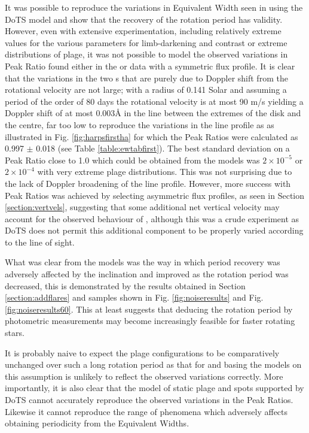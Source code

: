 It was possible to reproduce the variations in Equivalent Width seen in {\prox} using the DoTS model and show that the
recovery of the rotation period has validity. However, even with extensive experimentation, including relatively extreme
values for the various parameters for limb-darkening and contrast or extreme distributions of plage, it was not possible
to model the observed variations in Peak Ratio found either in the {\uves} or {\harps} data with a symmetric flux
profile. It is clear that the variations in the two \horn s that are purely due to Doppler shift from the rotational
velocity are not large; with a radius of 0.141 Solar \citep{demory09} and assuming a period of the order of 80 days the
rotational velocity is at most 90 m/s yielding a Doppler shift of at most 0.003{\AA} in the {\ha} line between the
extremes of the disk and the centre, far too low to reproduce the variations in the {\ha} line profile as as illustrated
in Fig. \ref{fig:harpsfirstha} for which the Peak Ratios were calculated as 0.997 $ \pm $ 0.018 (see Table
\ref{table:ewtabfirst}). The best standard deviation on a Peak Ratio close to 1.0 which could be obtained from the
models was $2{\times}10^{-5}$ or $2{\times}10^{-4}$ with very extreme plage distributions. This was not surprising due
to the lack of Doppler broadening of the line profile. However, more success with Peak Ratios was achieved by selecting
asymmetric flux profiles, as seen in Section \ref{section:vertvels}, suggesting that some additional net vertical
velocity may account for the observed behaviour of \prox, although this was a crude experiment as DoTS does not permit
this additional component to be properly varied according to the line of sight.

What was clear from the models was the way in which period recovery was adversely affected by the inclination and
improved as the rotation period was decreased, this is demonstrated by the results obtained in Section
\ref{section:addflares} and samples shown in Fig. \ref{fig:noiseresults} and Fig. \ref{fig:noiseresults60}. This at
least suggests that deducing the rotation period by photometric measurements may become increasingly feasible for faster
rotating stars.

It is probably naive to expect the plage configurations to be comparatively unchanged over such a long rotation period
as that for {\prox} and basing the models on this assumption is unlikely to reflect the observed variations
correctly. More importantly, it is also clear that the model of static plage and spots supported by DoTS cannot
accurately reproduce the observed variations in the Peak Ratios. Likewise it cannot reproduce the range of phenomena which
adversely affects obtaining periodicity from the Equivalent Widths.


